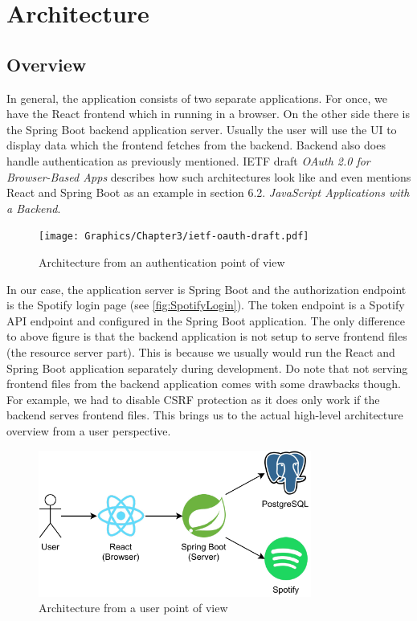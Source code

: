\chapter{Architecture}
\label{ch:Architecture}

\section{Overview}

In general, the application consists of two separate applications. For once, we have the React frontend which in running in a browser. On the other side there is the Spring Boot backend application server. Usually the user will use the UI to display data which the frontend fetches from the backend. Backend also does handle authentication as previously mentioned. \ac{IETF} draft \textit{OAuth 2.0 for Browser-Based Apps} describes how such architectures look like and even mentions React and Spring Boot as an example in section 6.2. \textit{JavaScript Applications with a Backend}.

\begin{figure}[bth]
    \centering
    \texttt{[image: Graphics/Chapter3/ietf-oauth-draft.pdf]}
    \caption{Architecture from an authentication point of view \cite[Section~6.2]{IetfOauthDraft}}
\end{figure}

In our case, the application server is Spring Boot and the authorization endpoint is the Spotify login page (see \autoref{fig:SpotifyLogin}). The token endpoint is a Spotify API endpoint and configured in the Spring Boot application. The only difference to above figure is that the backend application is not setup to serve frontend files (the resource server part). This is because we usually would run the React and Spring Boot application separately during development. Do note that not serving frontend files from the backend application comes with some drawbacks though. For example, we had to disable \ac{CSRF} protection as it does only work if the backend serves frontend files. This brings us to the actual high-level architecture overview from a user perspective.

\begin{figure}[bth]
    \centering
    \includegraphics[width=0.8\textwidth]{Graphics/Chapter3/architecture-overview.pdf}
    \caption{Architecture from a user point of view}
\end{figure}

